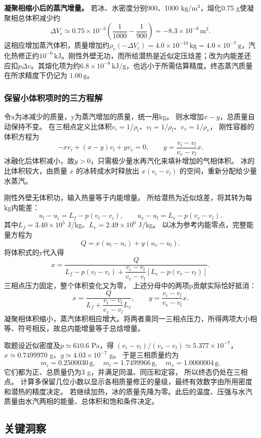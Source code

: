 \documentclass[UTF8,fontset=fandol,a4paper,11pt]{ctexart}
\begin{document}
\textbf{凝聚相缩小后的蒸汽增量。} 若冰、水密度分别900、1000 $\mathrm{kg/m^3}$，熔化0.75 g使凝聚相总体积减少约
\[
\Delta V_c\simeq0.75\times10^{-3}\left(\frac1{1000}-\frac1{900}\right)
=-8.3\times10^{-8}\,\mathrm{m^3}.
\]
这相应增加蒸汽体积，质量增加约$\rho_v(-\Delta V_c)=4.0\times10^{-10}\,\mathrm{kg}=4.0\times10^{-7}\,\mathrm g$，汽化热修正约$10^{-6}\,\mathrm{kJ}$。刚性外壁无功，而所给潜热是近似定压焓差；改为内能差还应扣$p\Delta v$。其熔化项为约$6.8\times10^{-8}\,\mathrm{kJ/g}$，也远小于所需估算精度。终态蒸汽质量在所求精度下仍记为 $1.00\,\mathrm g$。
\subsubsection*{保留小体积项时的三方程解}
令x为冰减少的质量，y为蒸汽增加的质量，统一用kg。
则水增加$x-y$，总质量自动保持不变。
在三相点定义比体积$v_i=1/\rho_i$、$v_l=1/\rho_l$、$v_v=1/\rho_v$，
刚性容器的体积方程为
\[
-xv_i+(x-y)v_l+yv_v=0,
\qquad y=\frac{v_i-v_l}{v_v-v_l}x.
\]
冰融化后体积减小，故$y>0$，只需极少量水再汽化来填补增加的气相体积。
冰的比体积较大，由质量 $x$ 的冰转成水时释放出 $x(v_i-v_l)$ 的空间，重新分配给少量水蒸汽。

刚性外壁无体积功，输入热量等于内能增量。
所给潜热为近似焓差，将其转为每kg内能差：
\[
u_l-u_i=L_f-p(v_l-v_i),\qquad
u_v-u_l=L_v-p(v_v-v_l).
\]
其中$L_f=3.40\times10^5$ J/kg、$L_v=2.49\times10^6$ J/kg。
以冰为参考内能零点，完整能量方程为
\[
Q=x(u_l-u_i)+y(u_v-u_l).
\]
将体积式的y代入得
\[
x=\frac{Q}{L_f-p(v_l-v_i)
+\dfrac{v_i-v_l}{v_v-v_l}[L_v-p(v_v-v_l)]}.
\]
三相点压力固定，整个体积变化又为零，
上述分母中的两项p贡献实际恰好抵消：
\[
x=\frac{Q}{L_f+\dfrac{v_i-v_l}{v_v-v_l}L_v},\qquad
y=\frac{v_i-v_l}{v_v-v_l}x.
\]
凝聚相体积缩小，蒸汽体积相应增大。将两者乘同一三相点压力，所得两项大小相等、符号相反，故总内能增量等于总焓增量。

取题设近似密度及$p\simeq610.6$ Pa，得
$(v_i-v_l)/(v_v-v_l)\simeq5.377\times10^{-7}$，
$x\simeq0.7499970$ g、$y\simeq4.03\times10^{-7}$ g。
于是三相质量约为
\[
m_i=0.2500030\,\mathrm g,\quad
m_l=1.7499966\,\mathrm g,\quad
m_v=1.0000004\,\mathrm g.
\]
它们都为正、总质量仍为3 g，并满足同温、同压和定容，
所以终态仍处在三相点。
计算多保留几位小数以显示各相质量修正的量级，最终有效数字由所用密度和潜热的精度决定。
若继续加热，冰的质量先降为零。此后的温度、压强与水汽质量由水汽两相的能量、总体积和饱和条件决定。




\subsection*{关键洞察}
\end{document}
